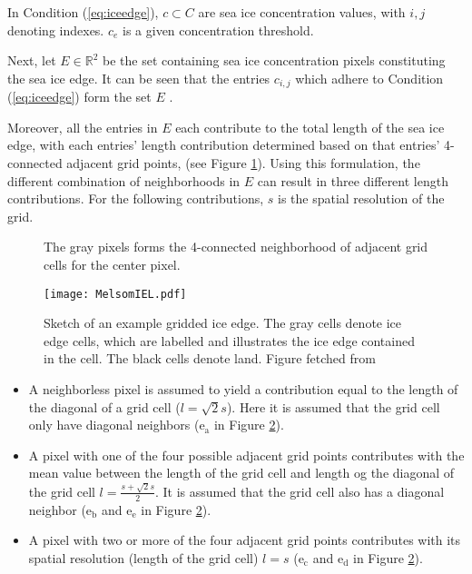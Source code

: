 \documentclass[../main/thesis.tex]{subfiles}
\begin{document}
In Condition (\ref{eq:iceedge}), $c \subset C$ are sea ice concentration values, with $i,j$ denoting indexes. $c_e$ is a given concentration threshold.

Next, let $E \in{\mathbb{R}^2}$ be the set containing sea ice concentration pixels constituting the sea ice edge. It can be seen that the entries $c_{i,j}$ which adhere to Condition (\ref{eq:iceedge}) form the set $E$ \citep{Melsom2019}.

Moreover, all the entries in $E$ each contribute to the total length of the sea ice edge, with each entries' length contribution determined based on that entries' 4-connected adjacent grid points, (see Figure \ref{fig:4-connection}). Using this formulation, the different combination of neighborhoods in $E$ can result in three different length contributions. For the following contributions, $s$ is the spatial resolution of the grid.

\begin{figure}
    \centering
    
    \caption{\label{fig:4-connection}The gray pixels forms the 4-connected neighborhood of adjacent grid cells for the center pixel.}
\end{figure}

\begin{figure}
    \centering
    \texttt{[image: MelsomIEL.pdf]}
    \caption{\label{fig:iceedgeschematic}Sketch of an example gridded ice edge. The gray cells denote ice edge cells, which are labelled and illustrates the ice edge contained in the cell. The black cells denote land. Figure fetched from \protect\citet{Melsom2019}}
\end{figure}

\begin{itemize}
    \item A neighborless pixel is assumed to yield a contribution equal to the length of the diagonal of a grid cell ($l = \sqrt2s$). Here it is assumed that the grid cell only have diagonal neighbors ($\text{e}_\text{a}$ in Figure \ref{fig:iceedgeschematic}).
    \item A pixel with one of the four possible adjacent grid points contributes with the mean value between the length of the grid cell and length og the diagonal of the grid cell $l = \frac{s + \sqrt2s}{2}$. It is assumed that the grid cell also has a diagonal neighbor ($\text{e}_\text{b}$ and $\text{e}_\text{e}$ in Figure \ref{fig:iceedgeschematic}).
    \item A pixel with two or more of the four adjacent grid points contributes with its spatial resolution (length of the grid cell) $l = s$ ($\text{e}_\text{c}$ and $\text{e}_\text{d}$ in Figure \ref{fig:iceedgeschematic}).
\end{itemize}
\end{document}
